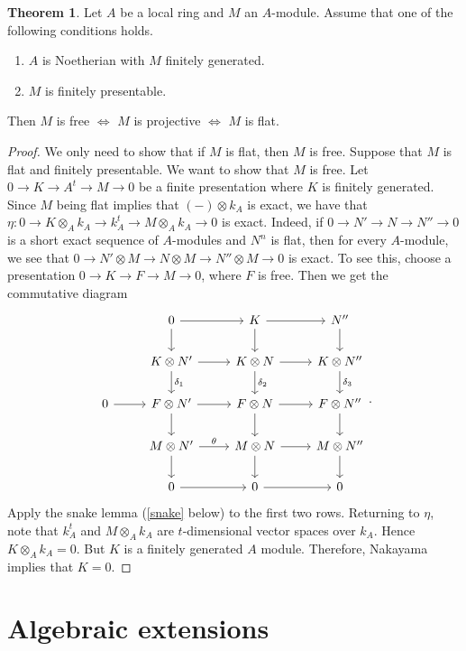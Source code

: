 \documentclass[10pt,letterpaper,cm]{nupset}
\theoremstyle{definition}
\theoremstyle{theorem}
\newtheorem{theorem}[definition]{Theorem}
\theoremstyle{remark}
\newcommand{\1}{\mathbf{1}}
\newcommand{\0}{\vec 0}
\begin{document}
\begin{theorem}
Let $A$ be a local ring and $M$ an $A$-module. Assume that one of the following conditions holds.
\begin{enumerate}[label=(\alph*)]
\item $A$ is Noetherian with $M$ finitely generated.
\item $M$ is finitely presentable.
\end{enumerate}
Then $M$ is free $\iff$ $M$ is projective $\iff$ $M$ is flat.
\end{theorem}
\begin{proof}
We only need to show that if $M$ is flat, then $M$ is free. Suppose that $M$ is flat and finitely presentable. We want to show that $M$ is free. Let $0 \to K \to A^t \to M \to 0$ be a finite presentation  where $K$ is finitely generated. Since $M$ being flat implies that $(-) \otimes k_A$ is exact, we have that $\eta : 0 \to K \otimes_A k_A \to k_A^t \to M \otimes_A k_A \to 0$ is exact. Indeed, if $0 \to N' \to N \to N'' \to 0$ is a short exact sequence of $A$-modules and $N^n$ is flat, then for every $A$-module, we see that $0 \to N' \otimes M \to N \otimes M \to N'' \otimes M \to 0$ is exact. To see this, choose a presentation $0 \to K \to F \to M \to 0$, where $F$ is free. Then we get the commutative diagram
\[
\begin{tikzcd}
 & 0 \arrow[r] \arrow[d] & K \arrow[r] \arrow[d] & N'' \arrow[d] \\
 & K \otimes N' \arrow[r] \arrow[d, "\delta_1"] & K \otimes N \arrow[r] \arrow[d, "\delta_2"] & K \otimes N'' \arrow[d, "\delta_3"] \\
0 \arrow[r] & F \otimes N' \arrow[r] \arrow[d] & F \otimes N \arrow[r] \arrow[d] & F \otimes N'' \arrow[d] \\
 & M \otimes N' \arrow[r, "\theta"] \arrow[d] & M \otimes N \arrow[r] \arrow[d] & M \otimes N'' \arrow[d] \\
 & 0 \arrow[r] & 0 \arrow[r] & 0
\end{tikzcd}
.\]  Apply the snake lemma (\cref{snake} below) to the first two rows.  Returning to $\eta$, note that $k_A^t$ and $M \otimes_A k_A$ are $t$-dimensional vector spaces over $k_A$. Hence $K \otimes_A k_A = 0$. But $K$ is a finitely generated $A$ module. Therefore, Nakayama implies  that $K = 0$. 
\end{proof}

\section{Algebraic extensions}
\end{document}
